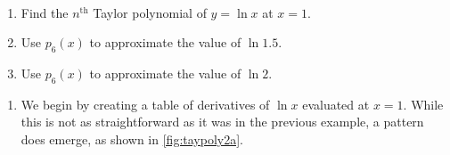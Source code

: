 \begin{example}\label{ex_taypoly2}%
\mbox{}\\[-2\baselineskip]\parbox[t]{\linewidth}{\begin{enumerate}
	\item	Find the $n^{\text{th}}$ Taylor polynomial of $y=\ln x$ at $x=1$.
	\item	Use $p_6(x)$ to approximate the value of $\ln 1.5$.
	\item	Use $p_6(x)$ to approximate the value of $\ln 2$. 
\end{enumerate}}\vspace{0pt}
\solution
\begin{enumerate}
\item	We begin by creating a table of derivatives of $\ln x$ evaluated at $x=1$. While this is not as straightforward as it was in the previous example, a pattern does emerge, as shown in \autoref{fig:taypoly2a}.


\end{enumerate}
\end{example}
